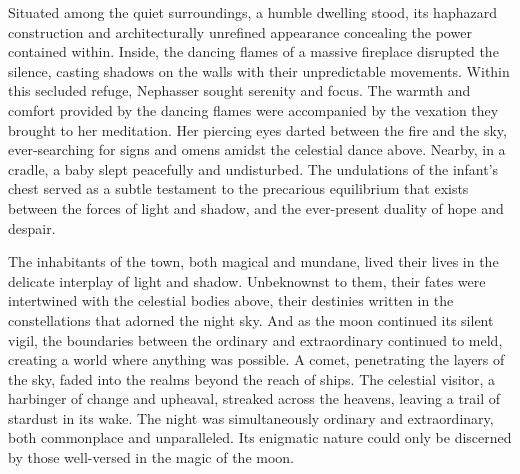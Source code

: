 Situated among the quiet surroundings, a humble dwelling stood, its haphazard construction and architecturally unrefined appearance concealing the power contained within. Inside, the dancing flames of a massive fireplace disrupted the silence, casting shadows on the walls with their unpredictable movements. Within this secluded refuge, Nephasser sought serenity and focus. The warmth and comfort provided by the dancing flames were accompanied by the vexation they brought to her meditation. Her piercing eyes darted between the fire and the sky, ever-searching for signs and omens amidst the celestial dance above. Nearby, in a cradle, a baby slept peacefully and undisturbed. The undulations of the infant's chest served as a subtle testament to the precarious equilibrium that exists between the forces of light and shadow, and the ever-present duality of hope and despair.

The inhabitants of the town, both magical and mundane, lived their lives in the delicate interplay of light and shadow. Unbeknownst to them, their fates were intertwined with the celestial bodies above, their destinies written in the constellations that adorned the night sky. And as the moon continued its silent vigil, the boundaries between the ordinary and extraordinary continued to meld, creating a world where anything was possible. A comet, penetrating the layers of the sky, faded into the realms beyond the reach of ships. The celestial visitor, a harbinger of change and upheaval, streaked across the heavens, leaving a trail of stardust in its wake. The night was simultaneously ordinary and extraordinary, both commonplace and unparalleled. Its enigmatic nature could only be discerned by those well-versed in the magic of the moon.
